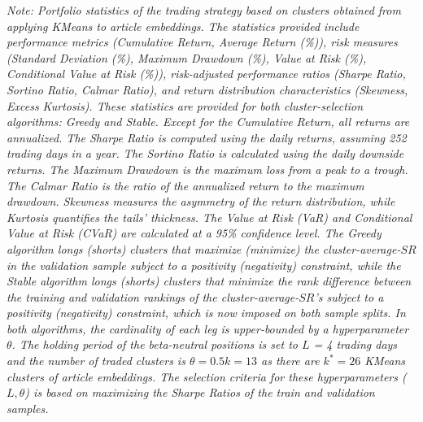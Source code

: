 \begin{table}[H]
\vspace{0.5cm}
\begin{minipage}{\textwidth}
\setlength{\parindent}{0pt}
{\footnotesize\textit{Note:
Portfolio statistics of the trading strategy based on clusters obtained from applying KMeans to article embeddings. 
The statistics provided include performance metrics (Cumulative Return, Average Return (\%)), risk measures (Standard Deviation (\%), Maximum Drawdown (\%), Value at Risk (\%), Conditional Value at Risk (\%)), risk-adjusted performance ratios (Sharpe Ratio, Sortino Ratio, Calmar Ratio), and return distribution characteristics (Skewness, Excess Kurtosis). These statistics are provided for both cluster-selection algorithms: Greedy and Stable.
Except for the Cumulative Return, all returns are annualized. The Sharpe Ratio is computed using the daily returns, assuming 252 trading days in a year. The Sortino Ratio is calculated using the daily downside returns. The Maximum Drawdown is the maximum loss from a peak to a trough. The Calmar Ratio is the ratio of the annualized return to the maximum drawdown. Skewness measures the asymmetry of the return distribution, while Kurtosis quantifies the tails' thickness. The Value at Risk (VaR) and Conditional Value at Risk (CVaR) are calculated at a 95\% confidence level.
The Greedy algorithm longs (shorts) clusters that maximize (minimize) the cluster-average-$SR$ in the validation sample subject to a positivity (negativity) constraint, while the Stable algorithm longs (shorts) clusters that minimize the rank difference between the training and validation rankings of the cluster-average-$SR$'s subject to a positivity (negativity) constraint, which is now imposed on both sample splits. In both algorithms, the cardinality of each leg is upper-bounded by a hyperparameter $\theta$.
The holding period of the beta-neutral positions is set to $L$ = 4 trading days and the number of traded clusters is $\theta = 0.5k=13$ as there are $k^*=26$ KMeans clusters of article embeddings. The selection criteria for these hyperparameters ($L,\theta$) is based on maximizing the Sharpe Ratios of the train and validation samples.
}}
\end{minipage}
\end{table}
